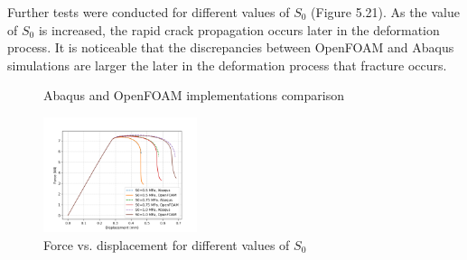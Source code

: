 \documentclass[sn-mathphys,Numbered,draft]{sn-jnl}%
\begin{document}
Further tests were conducted for different values of $S_0$ (Figure 5.21). As the value of $S_0$ is increased, the rapid crack propagation occurs later in the deformation process. It is noticeable that the discrepancies between OpenFOAM and Abaqus simulations are larger the later in the deformation process that fracture occurs.

\begin{figure}[htb]
	\centering
	
		
		\caption{Abaqus and OpenFOAM implementations comparison}
	\label{label_for_entire_figure}
\end{figure}
\FloatBarrier

\begin{figure}[htb]
\begin{center}
	\includegraphics[width=0.4\textwidth]{./Figures/LemaitreCompare/borden/lemaitreBordenCompare.png}
\caption{Force vs. displacement for different values of $S_0$}
\label{fig:notchedRoundBAr}
\end{center}
\end{figure}
\FloatBarrier
\end{document}
